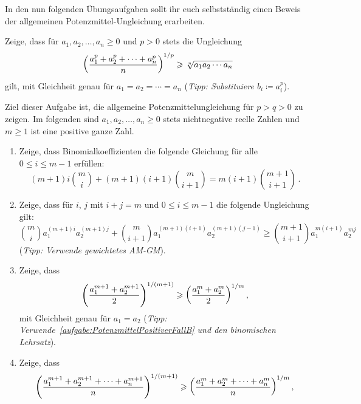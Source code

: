 In den nun folgenden Übungsaufgaben sollt ihr euch selbstständig einen Beweis der allgemeinen Potenzmittel-Ungleichung erarbeiten.
\begin{aufgabe*}\label{aufgabe:PotenzmittelGroesserGM}
	Zeige, dass für $a_1,a_2,\dotsc,a_n\geqslant 0$ und $p>0$ stets die Ungleichung
	\begin{equation*}
		\parens*{\frac{a_1^p+a_2^p+\dotsb+a_n^p}{n}}^{1/p}\geqslant \sqrt[n]{a_1a_2\dotsm a_n}
	\end{equation*}
	gilt, mit Gleichheit genau für $a_1=a_2=\dotsb=a_n$ (\emph{Tipp: Substituiere $b_i\coloneqq a_i^p$}).
\end{aufgabe*}
\begin{aufgabe*}\label{aufgabe:PotenzmittelPositiverFall}
	Ziel dieser Aufgabe ist, die allgemeine Potenzmittelungleichung für $p>q>0$ zu zeigen. Im folgenden sind $a_1,a_2,\dotsc,a_n\geqslant 0$ stets nichtnegative reelle Zahlen und $m\geqslant 1$ ist eine positive ganze Zahl.
	\begin{enumerate}[label={$(\alph*)$},ref={$(\alph*)$}]
		\item Zeige, dass Binomialkoeffizienten die folgende Gleichung für alle $0\leqslant i\leqslant m-1$ erfüllen:\label{aufgabe:PotenzmittelPositiverFallA}
		\begin{equation*}
			(m+1)i\binom{m}{i}+(m+1)(i+1)\binom{m}{i+1}=m(i+1)\binom{m+1}{i+1}\,.
		\end{equation*}
		\item Zeige, dass für $i$, $j$ mit $i+j=m$ und $0\leqslant i\leqslant m-1$ die folgende Ungleichung gilt:\label{aufgabe:PotenzmittelPositiverFallB}
		\begin{equation*}
			\binom{m}{i}a_1^{(m+1)i}a_2^{(m+1)j}+\binom{m}{i+1}a_1^{(m+1)(i+1)}a_2^{(m+1)(j-1)}\geqslant \binom{m+1}{i+1}a_1^{m(i+1)}a_2^{mj}
		\end{equation*}
		(\emph{Tipp: Verwende gewichtetes AM-GM}).
		\item Zeige, dass
		\begin{equation*}
			\parens*{\frac{a_1^{m+1}+a_2^{m+1}}{2}}^{1/(m+1)}\geqslant \parens*{\frac{a_1^{m}+a_2^{m}}{2}}^{1/m}\,,
		\end{equation*}
		mit Gleichheit genau für $a_1=a_2$ (\emph{Tipp: Verwende~\ref{aufgabe:PotenzmittelPositiverFallB} und den binomischen Lehrsatz}).
		\item Zeige, dass
		\begin{equation*}
			\parens*{\frac{a_1^{m+1}+a_2^{m+1}+\dotsb+a_n^{m+1}}{n}}^{1/(m+1)}\geqslant \parens*{\frac{a_1^{m}+a_2^{m}+\dotsb+a_n^m}{n}}^{1/m}\,,

\end{equation*}
\end{enumerate}
\end{aufgabe*}
